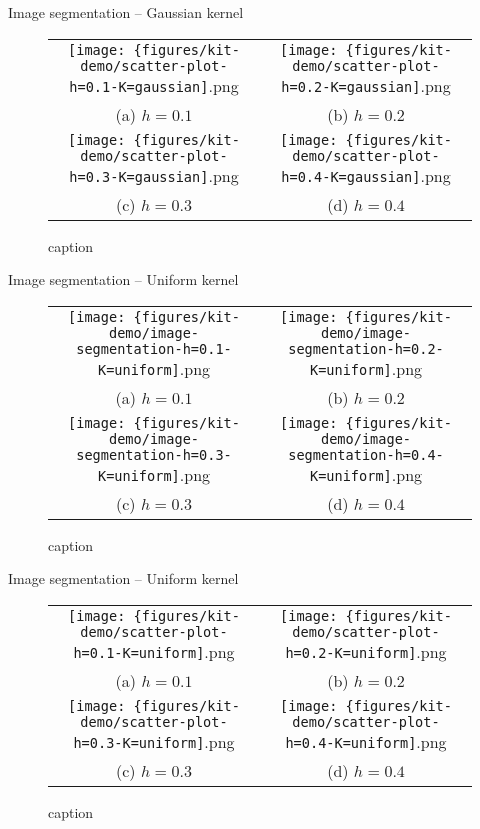 \documentclass[18pt]{beamer}
\begin{document}
\begin{frame}{Image segmentation -- Gaussian kernel}
\tiny
\begin{figure}
\begin{tabular}{cc}
	\texttt{[image: \{figures/kit-demo/scatter-plot-h=0.1-K=gaussian]}.png} &   \texttt{[image: \{figures/kit-demo/scatter-plot-h=0.2-K=gaussian]}.png} \\
	(a) $h = 0.1$ & (b) $h = 0.2$ \\[6pt]
	\texttt{[image: \{figures/kit-demo/scatter-plot-h=0.3-K=gaussian]}.png} &   \texttt{[image: \{figures/kit-demo/scatter-plot-h=0.4-K=gaussian]}.png} \\
	(c) $h = 0.3$ & (d) $h = 0.4$ \\[6pt]
\end{tabular}
\caption{caption}
\end{figure}
\end{frame}


\begin{frame}{Image segmentation -- Uniform kernel}
\tiny
\begin{figure}
\begin{tabular}{cc}
\texttt{[image: \{figures/kit-demo/image-segmentation-h=0.1-K=uniform]}.png} &   \texttt{[image: \{figures/kit-demo/image-segmentation-h=0.2-K=uniform]}.png} \\
(a) $h = 0.1$ & (b) $h = 0.2$ \\[6pt]
\texttt{[image: \{figures/kit-demo/image-segmentation-h=0.3-K=uniform]}.png} &   \texttt{[image: \{figures/kit-demo/image-segmentation-h=0.4-K=uniform]}.png} \\
(c) $h = 0.3$ & (d) $h = 0.4$ \\[6pt]
\end{tabular}
\caption{caption}
\end{figure}
\end{frame}


\begin{frame}{Image segmentation -- Uniform kernel}
\tiny
\begin{figure}
\begin{tabular}{cc}
\texttt{[image: \{figures/kit-demo/scatter-plot-h=0.1-K=uniform]}.png} &   \texttt{[image: \{figures/kit-demo/scatter-plot-h=0.2-K=uniform]}.png} \\
(a) $h = 0.1$ & (b) $h = 0.2$ \\[6pt]
\texttt{[image: \{figures/kit-demo/scatter-plot-h=0.3-K=uniform]}.png} &   \texttt{[image: \{figures/kit-demo/scatter-plot-h=0.4-K=uniform]}.png} \\
(c) $h = 0.3$ & (d) $h = 0.4$ \\[6pt]
\end{tabular}
\caption{caption}
\end{figure}
\end{frame}
\end{document}
